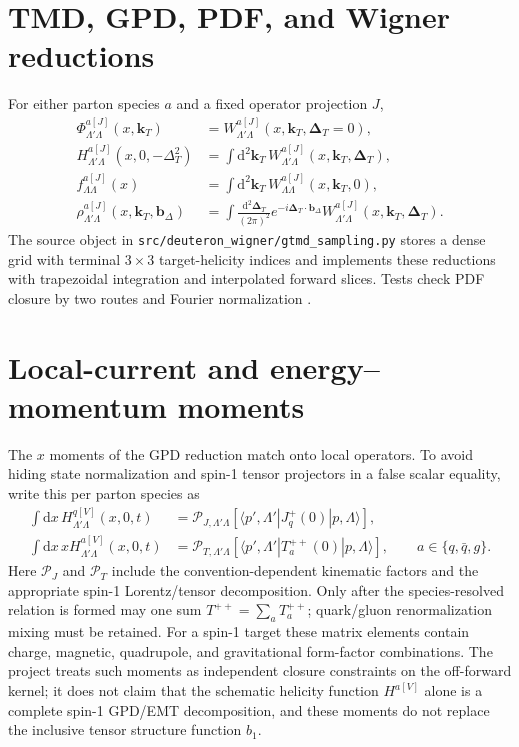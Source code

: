 \documentclass[11pt,oneside]{book}
\newcommand{\kT}{\bm{k}_{T}}
\newcommand{\DeltaT}{\bm{\Delta}_{T}}
\newcommand{\bDelta}{\bm{b}_{\Delta}}
\newcommand{\dd}{\mathrm{d}}
\newcommand{\codepath}[1]{\nolinkurl{#1}}
\newcommand{\statuscode}[1]{\text{\ttfamily\detokenize{#1}}}
\begin{document}
\section{TMD, GPD, PDF, and Wigner reductions}

For either parton species $a$ and a fixed operator projection $J$,
\begin{align}
 \Phi_{\Lambda'\Lambda}^{a[J]}(x,\kT)
 &=W_{\Lambda'\Lambda}^{a[J]}(x,\kT,\DeltaT=0),
 \label{eq:tmd-limit}\\
 H_{\Lambda'\Lambda}^{a[J]}(x,0,-\Delta_T^2)
 &=\int\dd^2\kT\,W_{\Lambda'\Lambda}^{a[J]}(x,\kT,\DeltaT),
 \label{eq:gpd-limit}\\
 f_{\Lambda\Lambda}^{a[J]}(x)
 &=\int\dd^2\kT\,W_{\Lambda\Lambda}^{a[J]}(x,\kT,0),
 \label{eq:pdf-limit}\\
 \rho_{\Lambda'\Lambda}^{a[J]}(x,\kT,\bDelta)
 &=\int\frac{\dd^2\DeltaT}{(2\pi)^2}
 e^{-i\DeltaT\cdot\bDelta}
 W_{\Lambda'\Lambda}^{a[J]}(x,\kT,\DeltaT).
 \label{eq:wigner-limit}
\end{align}
The source object \statuscode{SampledGTMD} in \codepath{src/deuteron_wigner/gtmd_sampling.py} stores a dense grid with terminal $3\times3$ target-helicity indices and implements these reductions with trapezoidal integration and interpolated forward slices.  Tests check PDF closure by two routes and Fourier normalization \cite{DWSourceAudit2026}.

\section{Local-current and energy--momentum moments}

The $x$ moments of the GPD reduction match onto local operators.  To avoid hiding state normalization and spin-1 tensor projectors in a false scalar equality, write this per parton species as
\begin{align}
 \int\dd x\,H_{\Lambda'\Lambda}^{q[V]}(x,0,t)
 &=\mathcal P_{J,\Lambda'\Lambda}
 \!\left[\langle p',\Lambda'|J_q^+(0)|p,\Lambda\rangle\right],
 \label{eq:vector-moment}\\
 \int\dd x\,xH_{\Lambda'\Lambda}^{a[V]}(x,0,t)
 &=\mathcal P_{T,\Lambda'\Lambda}
 \!\left[\langle p',\Lambda'|T_a^{++}(0)|p,\Lambda\rangle\right],
 \qquad a\in\{q,\bar q,g\}.
 \label{eq:emt-moment}
\end{align}
Here $\mathcal P_J$ and $\mathcal P_T$ include the convention-dependent kinematic factors and the appropriate spin-1 Lorentz/tensor decomposition.  Only after the species-resolved relation is formed may one sum $T^{++}=\sum_a T_a^{++}$; quark/gluon renormalization mixing must be retained.  For a spin-1 target these matrix elements contain charge, magnetic, quadrupole, and gravitational form-factor combinations.  The project treats such moments as independent closure constraints on the off-forward kernel; it does not claim that the schematic helicity function $H^{a[V]}$ alone is a complete spin-1 GPD/EMT decomposition, and these moments do not replace the inclusive tensor structure function $b_1$.
\end{document}
